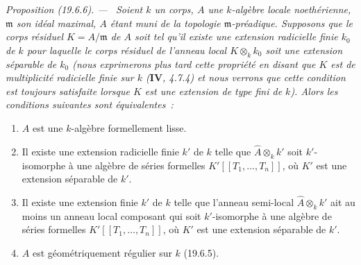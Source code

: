 \documentclass[10pt,oneside]{book}
\makeatletter
\newcommand{\setmanualcurrentlabel}[1]{\def\@currentlabel{#1}}
\newenvironment{proposition}[1][]{%
  \setmanualcurrentlabel{#1}\par\medskip\noindent\itshape Proposition (#1). ---\ }{\par}
\makeatother
\begin{document}
\begin{proposition}[19.6.6]
\label{0.19.6.6-fr}
Soient $k$ un corps, $A$ une $k$-algèbre locale noethérienne, $\mathfrak m$ son
idéal maximal, $A$ étant muni de la topologie $\mathfrak m$-préadique.
Supposons que le corps résiduel $K=A/\mathfrak m$ de $A$ soit tel qu'il existe
une extension radicielle finie $k_0$ de $k$ pour laquelle le corps résiduel de
l'anneau local $K\otimes_k k_0$ soit une extension séparable de $k_0$ (nous
exprimerons plus tard cette propriété en disant que $K$ est de
\emph{multiplicité radicielle finie} sur $k$ ($\mathbf{IV}$, 4.7.4) et nous
verrons que cette condition est toujours satisfaite lorsque $K$ est une
\emph{extension de type fini} de $k$). Alors les conditions suivantes sont
équivalentes~:
\begin{enumerate}
  \item[a)] $A$ est une $k$-algèbre formellement lisse.
  \item[b)] Il existe une extension radicielle finie $k'$ de $k$ telle que
  $\widehat A\otimes_k k'$ soit $k'$-isomorphe à une algèbre de séries
  formelles $K'[[T_1,\ldots,T_n]]$, où $K'$ est une extension séparable de
  $k'$.
  \item[b')] Il existe une extension finie $k'$ de $k$ telle que l'anneau
  semi-local $\widehat A\otimes_k k'$ ait au moins un anneau local composant
  qui soit $k'$-isomorphe à une algèbre de séries formelles
  $K'[[T_1,\ldots,T_n]]$, où $K'$ est une extension séparable de $k'$.
  \item[c)] $A$ est géométriquement régulier sur $k$ (19.6.5).
\end{enumerate}
\end{proposition}
\end{document}
